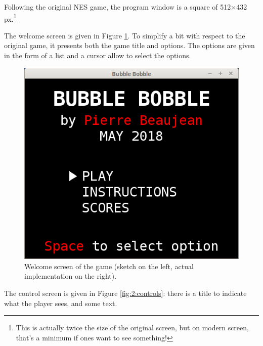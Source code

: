 \documentclass[12pt,a4paper]{article}
\begin{document}
Following the original NES game, the program window is a square of 512$\times$432 px.\footnote{This is actually twice the size of the original screen, but on modern screen, that's a minimum if ones want to see something!}

The welcome screen is given in Figure \ref{fig:1:welcome}. To simplify a bit with respect to the original game, it presents both the game title and options. The options are given in the form of a list and a cursor allow to select the options.

\begin{figure}[!h]
	\centering
	\hspace{.5cm}
	\includegraphics[width=.45\linewidth]{i/screen1}
	
	\caption{Welcome screen of the game (sketch on the left, actual implementation on the right).}
	\label{fig:1:welcome}
\end{figure}

The control screen is given in Figure \ref{fig:2:controls}: there is a title to indicate what the player sees, and some text.
\end{document}
